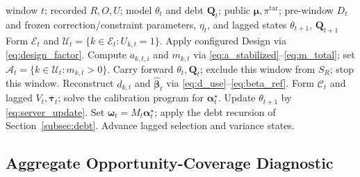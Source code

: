 \documentclass[letterpaper,journal]{IEEEtran}
\begin{document}
\begin{algorithm}[t]
\caption{Window-close RAVEN-MCS with configured Design}
\label{alg:window_close}
\begin{algorithmic}[1]
\REQUIRE window $t$; recorded $R,O,U$; model $\theta_t$ and debt $\mathbf Q_t$;
public $\boldsymbol\mu,\pi^{\mathrm{tar}}$; pre-window $D_t$ and frozen
correction/constraint parameters, $\eta_t$, and lagged states
\ENSURE $\theta_{t+1}$, $\mathbf Q_{t+1}$
\STATE Form $\mathcal E_t$ and $\mathcal U_t=\{k\in\mathcal E_t:U_{k,t}=1\}$.
\STATE Apply configured Design via \eqref{eq:design_factor}.
\STATE Compute $a_{k,t,i}$ and $m_{k,t}$ via \eqref{eq:a_stabilized}--\eqref{eq:m_total};
set $\mathcal A_t=\{k\in\mathcal U_t:m_{k,t}>0\}$.
\STATE Carry forward $\theta_t,\mathbf Q_t$; exclude this window from $S_R$; stop this window.
\ELSE
\STATE Reconstruct $d_{k,t}$ and $\widehat{\boldsymbol\beta}_t$ via
\eqref{eq:d_use}--\eqref{eq:beta_ref}.
\STATE Form $\mathcal C_t$ and lagged $V_t,\overline{\boldsymbol\tau}_t$;
solve the calibration program for $\boldsymbol\alpha_t^\star$.
\STATE Update $\theta_{t+1}$ by \eqref{eq:server_update}.
\STATE Set $\boldsymbol\omega_t=M_t\boldsymbol\alpha_t^\star$;
apply the debt recursion of Section~\ref{subsec:debt}.
\STATE Advance lagged selection and variance states.
\ENDIF
\end{algorithmic}
\end{algorithm}

\subsection{Aggregate Opportunity-Coverage Diagnostic}
\label{subsec:agg_certificate_alg}
\label{subsec:agg_coverage_object}
\end{document}
